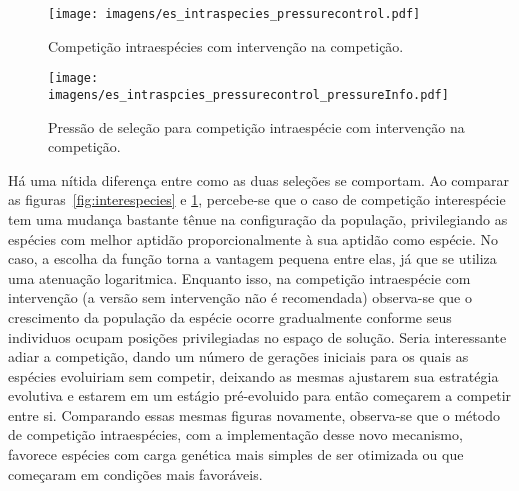 \begin{figure}[h!t]
\centering
\texttt{[image: imagens/es\_intraspecies\_pressurecontrol.pdf]}
\caption[Competição intraespécies com intervenção na
competição.]{Competição intraespécies com intervenção na competição.}
\label{fig:intraspecies_pressurecontrol}
\end{figure}

\begin{figure}[h!t]
\centering
\texttt{[image: imagens/es\_intraspcies\_pressurecontrol\_pressureInfo.pdf]}
\caption[Pressão de seleção para competição intraespécie com 
intervenção na competição.]{Pressão de seleção para competição
intraespécie com intervenção na competição.}
\label{fig:intraspecies_pressurecontrol_info}
\end{figure}

Há uma nítida diferença entre como as duas seleções se comportam. Ao
comparar as figuras~\ref{fig:interespecies} e
\ref{fig:intraspecies_pressurecontrol}, percebe-se que o caso de
competição interespécie tem uma mudança bastante tênue na configuração
da população, privilegiando as espécies com melhor aptidão
proporcionalmente à sua aptidão como espécie. No caso, a escolha da
função torna a vantagem pequena entre elas, já que se utiliza uma
atenuação logaritmica. Enquanto isso, na competição intraespécie com
intervenção (a versão sem intervenção não é recomendada) observa-se
que o crescimento da população da espécie ocorre gradualmente conforme
seus individuos ocupam posições privilegiadas no espaço de
solução. Seria interessante adiar a competição, dando um número de
gerações iniciais para os quais as espécies evoluiriam sem competir,
deixando as mesmas ajustarem sua estratégia evolutiva e estarem
em um estágio pré-evoluido para então começarem a competir entre si.
Comparando essas mesmas figuras novamente, observa-se que o método
de competição intraespécies, com a implementação desse novo mecanismo,
favorece espécies com carga genética mais simples de ser otimizada ou
que começaram em condições mais favoráveis.


